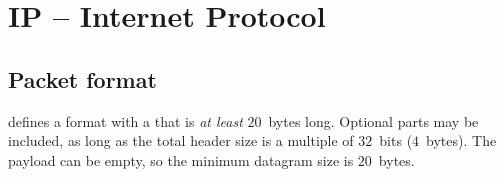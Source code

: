 % 







\section{IP -- Internet Protocol}

\subsection{Packet format}

 defines a  format with a  
that is \textit{at least} $20$~bytes long. Optional parts may be included,
as long as the total header size is a multiple of $32$~bits ($4$~bytes).
The payload can be empty, so the minimum datagram size is $20$~bytes.\\

